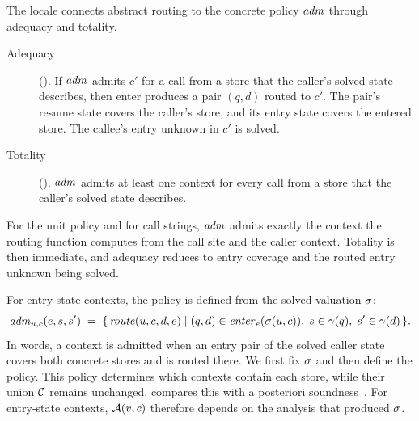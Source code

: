The locale  connects abstract routing to the concrete
policy $\mathit{adm}$ through adequacy and totality.
\begin{description}
  \item[Adequacy] (). If $\mathit{adm}$ admits $c'$ for a call
    from a store that the caller's solved state describes, then enter produces
    a pair $(q, d)$ routed to $c'$. The pair's resume state covers the
    caller's store, and its entry state covers the entered store. The
    callee's entry unknown in $c'$ is solved.
  \item[Totality] (). $\mathit{adm}$ admits at least one context
    for every call from a store that the caller's solved state describes.
\end{description}
For the unit policy and for call strings, $\mathit{adm}$ admits exactly the context the
routing function computes from the call site and the caller context. Totality
is then immediate, and adequacy reduces to entry coverage and the routed entry
unknown being solved.

For entry-state contexts, the policy  is
defined from the solved valuation $\sigma$:
\[
\mathit{adm}_{u,c}(e, s, s') \;=\; \{\, \mathit{route}(u, c, d, e) \mid
(q, d) \in \mathit{enter}_e(\sigma(u, c)),\; s \in \gamma(q),\; s' \in \gamma(d) \,\}.
\]
In words, a context is admitted when an entry pair of the solved caller state
covers both concrete stores and is routed there. We first fix $\sigma$ and
then define the policy. This policy determines which contexts contain each
store, while their union $\mathcal{C}$ remains unchanged.  compares this with a posteriori
soundness~\cite{might09}. For entry-state contexts, $\mathcal{A}(v, c)$
therefore depends on the analysis that produced $\sigma$.

